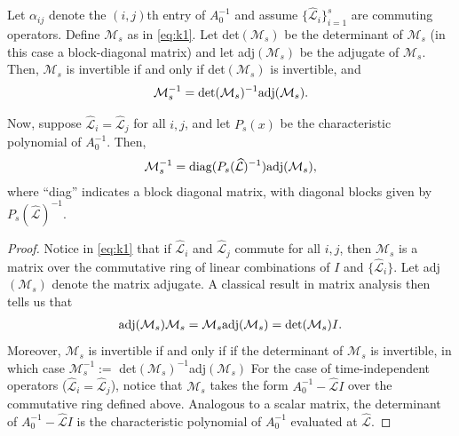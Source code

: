 \documentclass[review]{siamart}
\begin{document}
%
\begin{lemma}\label{lem:inv}
Let $\alpha_{ij}$ denote the $(i,j)$th entry of $A_0^{-1}$ and assume
$\{\widehat{\mathcal{L}}_i\}_{i=1}^s$ are commuting operators. Define $\mathcal{M}_s$
as in \eqref{eq:k1}.
Let det$(\mathcal{M}_s)$ be the determinant of $\mathcal{M}_s$ (in this case a block-diagonal
matrix) and let adj$(\mathcal{M}_s)$ be the adjugate of $\mathcal{M}_s$. Then, $\mathcal{M}_s$
is invertible if and only if det$(\mathcal{M}_s)$ is invertible, and
\begin{align*}
\mathcal{M}_s^{-1} = \textnormal{det}(\mathcal{M}_s)^{-1}\textnormal{adj}(\mathcal{M}_s).
\end{align*}
%

Now, suppose $\widehat{\mathcal{L}}_i = \widehat{\mathcal{L}}_j$ for all $i,j$, and let $P_s(x)$ be the
characteristic polynomial of $A_0^{-1}$. Then,
\begin{align*}
\mathcal{M}_s^{-1} = \textnormal{diag}(P_s(\widehat{\mathcal{L}})^{-1})\textnormal{adj}(\mathcal{M}_s),
\end{align*}
where ``diag'' indicates a block diagonal matrix, with diagonal blocks given by $P_s(\widehat{\mathcal{L}})^{-1}$.
\end{lemma}
%
\begin{proof}
Notice in \eqref{eq:k1} that if $\widehat{\mathcal{L}}_i$ and $\widehat{\mathcal{L}}_j$ commute for all $i,j$,
then $\mathcal{M}_s$ is a matrix over the commutative ring of linear combinations
of $I$ and $\{\widehat{\mathcal{L}}_i\}$. Let adj$(\mathcal{M}_s)$ denote the matrix adjugate. A
classical result in matrix analysis then tells us that
%
\begin{align*} 
\textnormal{adj}(\mathcal{M}_s)\mathcal{M}_s = \mathcal{M}_s\textnormal{adj}(\mathcal{M}_s)
	= \textnormal{det}(\mathcal{M}_s)I.
\end{align*}
%
Moreover, $\mathcal{M}_s$ is invertible if and only if if the determinant of $\mathcal{M}_s$
is invertible, in which case $\mathcal{M}_s^{-1} := $ det$(\mathcal{M}_s)^{-1}$adj$(\mathcal{M}_s)$
\cite[Theorem 2.19 \& Corollary 2.21]{brown1993matrices}
For the case of time-independent operators ($\widehat{\mathcal{L}}_i=\widehat{\mathcal{L}}_j$), notice that
$\mathcal{M}_s$ takes the form $A_0^{-1} - \widehat{\mathcal{L}}I$ over the commutative ring defined
above. Analogous to a scalar matrix, the determinant of $A_0^{-1} - \widehat{\mathcal{L}}I$ is the
characteristic polynomial of $A_0^{-1}$ evaluated at $\widehat{\mathcal{L}}$.
\end{proof}
%
\end{document}
